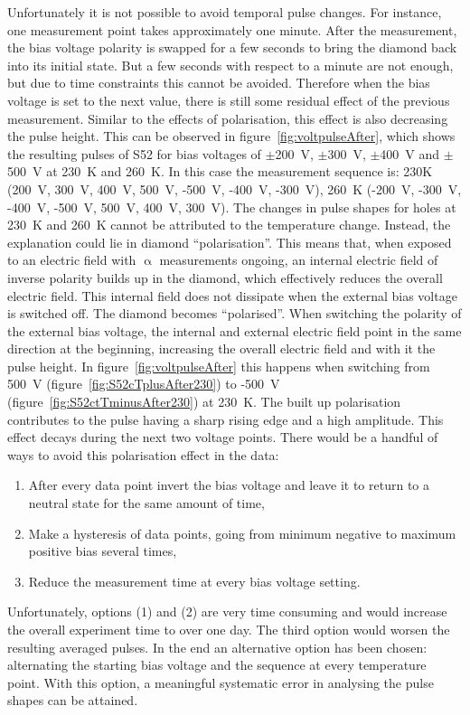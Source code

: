 Unfortunately it is not possible to avoid temporal pulse changes. For instance, one measurement point takes approximately one minute. After the measurement, the bias voltage polarity is swapped for a few seconds to bring the diamond back into its initial state. But a few seconds with respect to a minute are not enough, but due to time constraints this cannot be avoided. Therefore when the bias voltage is set to the next value, there is still some residual effect of the previous measurement. Similar to the effects of polarisation, this effect is also decreasing the pulse height. This can be observed in figure~\ref{fig:voltpulseAfter}, which shows the resulting pulses of S52 for bias voltages of $\pm$200~V, $\pm$300~V, $\pm$400~V and $\pm$500~V at 230~K and 260~K. In this case the measurement sequence is: 230K (200~V, 300~V, 400~V, 500~V, -500~V, -400~V, -300~V), 260~K (-200~V, -300~V, -400~V, -500~V, 500~V, 400~V, 300~V). The changes in pulse shapes for holes at 230~K and 260~K cannot be attributed to the temperature change. Instead, the explanation could lie in diamond ``polarisation''. This means that, when exposed to an electric field with $\upalpha$ measurements ongoing, an internal electric field of inverse polarity builds up in the diamond, which effectively reduces the overall electric field. This internal field does not dissipate when the external bias voltage is switched off. The diamond becomes ``polarised''. When switching the polarity of the external bias voltage, the internal and external electric field point in the same direction at the beginning, increasing the overall electric field and with it the pulse height. In figure~\ref{fig:voltpulseAfter} this happens when switching from 500~V (figure~\ref{fig:S52cTplusAfter230}) to -500~V (figure~\ref{fig:S52ctTminusAfter230}) at 230~K. The built up polarisation contributes to the pulse having a sharp rising edge and a high amplitude. This effect decays during the next two voltage points. There would be a handful of ways to avoid this polarisation effect in the data: 

\begin{enumerate}[itemsep=0.1\baselineskip]
\item After every data point invert the bias voltage and leave it to return to a neutral state for the same amount of time, 
\item Make a hysteresis of data points, going from minimum negative to maximum positive bias several times, 
\item Reduce the measurement time at every bias voltage setting.
\end{enumerate}
Unfortunately, options (1) and (2) are very time consuming and would increase the overall experiment time to over one day. The third option would worsen the resulting averaged pulses. In the end an alternative option has been chosen: alternating the starting bias voltage and the sequence at every temperature point. With this option, a meaningful systematic error in analysing the pulse shapes can be attained.

